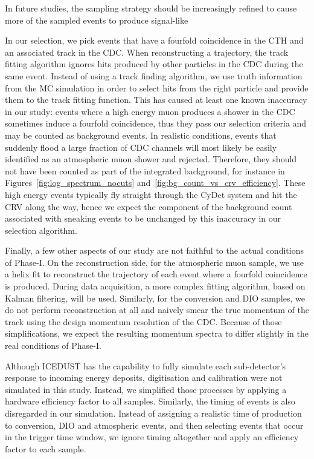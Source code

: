 In future studies, the sampling strategy should be increasingly refined to cause
more of the sampled events to produce signal-like

In our selection, we pick events that have a fourfold coincidence in the CTH and
an associated track in the CDC. When reconstructing a trajectory, the track
fitting algorithm ignores hits produced by other particles in the CDC during the
same event. Instead of using a track finding algorithm, we use truth information
from the MC simulation in order to select hits from the right particle and
provide them to the track fitting function. This has caused at least one known
inaccuracy in our study: events where a high energy muon produces a shower in
the CDC sometimes induce a fourfold coincidence, thus they pass our selection
criteria and may be counted as background events. In realistic conditions,
events that suddenly flood a large fraction of CDC channels will most likely be
easily identified as an atmospheric muon shower and rejected. Therefore, they
should not have been counted as part of the integrated background, for instance
in Figures~\ref{fig:log_spectrum_nocuts}
and~\ref{fig:bg_count_vs_crv_efficiency}. These high energy events typically fly
straight through the CyDet system and hit the CRV along the way, hence we
expect the component of the background count associated with sneaking events
to be unchanged by this inaccuracy in our selection algorithm.

Finally, a few other aspects of our study are not faithful to the actual conditions of
Phase-I. On the reconstruction side, for the atmospheric muon sample, we use a
helix fit to reconstruct the trajectory of each event where a fourfold
coincidence is produced. During data acquisition, a more complex fitting
algorithm, based on Kalman filtering, will be used. Similarly, for the
conversion and DIO samples, we do not perform reconstruction at all and naively
smear the true momentum of the track using the design momentum resolution of the
CDC. Because of those simplifications, we expect the resulting momentum spectra
to differ slightly in the real conditions of Phase-I. 

Although ICEDUST has the capability to fully simulate each sub-detector's
response to incoming energy deposits, digitisation and calibration were not
simulated in this study. Instead, we simplified those processes by applying a
hardware efficiency factor to all samples. 
Similarly, the timing of events is also disregarded in our simulation. Instead
of assigning a realistic time of production to conversion, DIO and atmospheric
events, and then selecting events that occur in the trigger time window, we
ignore timing altogether and apply an efficiency factor to each sample. 

